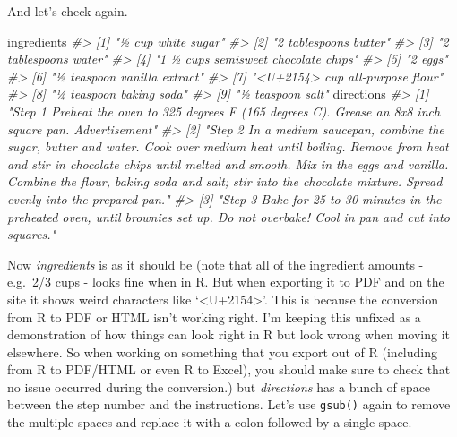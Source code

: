 \documentclass[
]{krantz}
\makeatletter
\newenvironment{Shaded}{\begin{snugshade}}{\end{snugshade}}
\newcommand{\CommentTok}[1]{\textcolor[rgb]{0.37,0.37,0.37}{\textit{#1}}}
\newcommand{\NormalTok}[1]{#1}
\newenvironment{kframe}{%
\medskip{}
\setlength{\fboxsep}{.8em}
 \def\at@end@of@kframe{}%
 \ifinner\ifhmode%
  \def\at@end@of@kframe{\end{minipage}}%
  \begin{minipage}{\columnwidth}%
 \fi\fi%
 \def\FrameCommand##1{\hskip\@totalleftmargin \hskip-\fboxsep
 \colorbox{shadecolor}{##1}\hskip-\fboxsep
     \hskip-\linewidth \hskip-\@totalleftmargin \hskip\columnwidth}%
 \MakeFramed {\advance\hsize-\width
   \@totalleftmargin\z@ \linewidth\hsize
   \@setminipage}}%
 {\par\unskip\endMakeFramed%
 \at@end@of@kframe}
\renewenvironment{Shaded}{\begin{kframe}}{\end{kframe}}
\makeatother
\begin{document}
And let's check again.

\begin{Shaded}
\begin{Highlighting}[]
\NormalTok{ingredients}
\CommentTok{\#\textgreater{} [1] "½ cup white sugar"                 }
\CommentTok{\#\textgreater{} [2] "2 tablespoons butter"              }
\CommentTok{\#\textgreater{} [3] "2 tablespoons water"               }
\CommentTok{\#\textgreater{} [4] "1 ½ cups semisweet chocolate chips"}
\CommentTok{\#\textgreater{} [5] "2 eggs"                            }
\CommentTok{\#\textgreater{} [6] "½ teaspoon vanilla extract"        }
\CommentTok{\#\textgreater{} [7] "\textless{}U+2154\textgreater{} cup all{-}purpose flour"    }
\CommentTok{\#\textgreater{} [8] "¼ teaspoon baking soda"            }
\CommentTok{\#\textgreater{} [9] "½ teaspoon salt"}
\NormalTok{directions}
\CommentTok{\#\textgreater{} [1] "Step 1   Preheat the oven to 325 degrees F (165 degrees C). Grease an 8x8 inch square pan.    Advertisement"                                                                                                                                                                                                               }
\CommentTok{\#\textgreater{} [2] "Step 2   In a medium saucepan, combine the sugar, butter and water. Cook over medium heat until boiling. Remove from heat and stir in chocolate chips until melted and smooth. Mix in the eggs and vanilla. Combine the flour, baking soda and salt; stir into the chocolate mixture. Spread evenly into the prepared pan."}
\CommentTok{\#\textgreater{} [3] "Step 3   Bake for 25 to 30 minutes in the preheated oven, until brownies set up. Do not overbake! Cool in pan and cut into squares."}
\end{Highlighting}
\end{Shaded}

Now \emph{ingredients} is as it should be (note that all of the ingredient amounts - e.g.~2/3 cups - looks fine when in R. But when exporting it to PDF and on the site it shows weird characters like `\textless U+2154\textgreater{}'. This is because the conversion from R to PDF or HTML isn't working right. I'm keeping this unfixed as a demonstration of how things can look right in R but look wrong when moving it elsewhere. So when working on something that you export out of R (including from R to PDF/HTML or even R to Excel), you should make sure to check that no issue occurred during the conversion.) but \emph{directions} has a bunch of space between the step number and the instructions. Let's use \texttt{gsub()} again to remove the multiple spaces and replace it with a colon followed by a single space.
\end{document}
